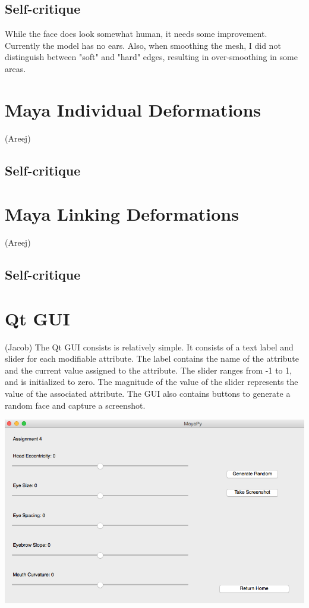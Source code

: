 \documentclass{article}
\begin{document}
  \subsection*{Self-critique}
  While the face does look somewhat human, it needs some improvement. Currently the model has no ears. Also, when smoothing the mesh, I did not distinguish between "soft" and "hard" edges, resulting in over-smoothing in some areas.
  
\section*{Maya Individual Deformations} (Areej)

  \subsection*{Self-critique}

\section*{Maya Linking Deformations} (Areej)

  \subsection*{Self-critique}

\section*{Qt GUI} (Jacob)
The Qt GUI consists is relatively simple. It consists of a text label and slider for each modifiable attribute. The label contains the name of the attribute and the current value assigned to the attribute. The slider ranges from -1 to 1, and is initialized to zero. The magnitude of the value of the slider represents the value of the associated attribute. The GUI also contains buttons to generate a random
face and capture a screenshot.\newline

\includegraphics[scale=.4]
  {gui.png}
\end{document}
